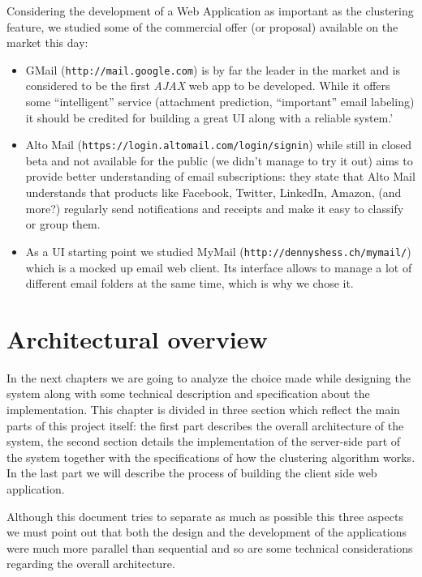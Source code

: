 \documentclass[a4paper,12pt]{report}
\begin{document}
Considering the development of a Web Application as important as the clustering feature, we studied some of the commercial offer (or proposal) available on the market this day:
\begin{itemize}
\item GMail (\texttt{http://mail.google.com}) is by far the leader in the market and is considered to be the first \emph{AJAX} web app to be developed. While it offers some ``intelligent'' service (attachment prediction, ``important'' email labeling) it should be credited for building a great UI along with a reliable system.'
\item Alto Mail (\texttt{https://login.altomail.com/login/signin}) while still in closed beta and not available for the public (we didn't manage to try it out) aims to provide better understanding of email subscriptions: they state that Alto Mail understands that products like Facebook, Twitter, LinkedIn, Amazon, (and more?) regularly send notifications and receipts and make it easy to classify or group them. 
\item As a UI starting point we studied MyMail (\texttt{http://dennyshess.ch/mymail/}) which is a mocked up email web client. Its interface allows to manage a lot of different email folders at the same time, which is why we chose it.
\end{itemize}


\chapter{Architectural overview}
In the next chapters we are going to analyze the choice made while designing the system along with some technical description and specification about the implementation. This chapter is divided in three section which reflect the main parts of this project itself: the first part describes the overall architecture of the system, the second section details the implementation of the server-side part of the system together with the specifications of how the clustering algorithm works. In the last part we will describe the process of building the client side web application.

Although this document tries to separate as much as possible this three aspects we must point out that both the design and the development of the applications were much more parallel than sequential and so are some technical considerations regarding the overall architecture.
\end{document}
